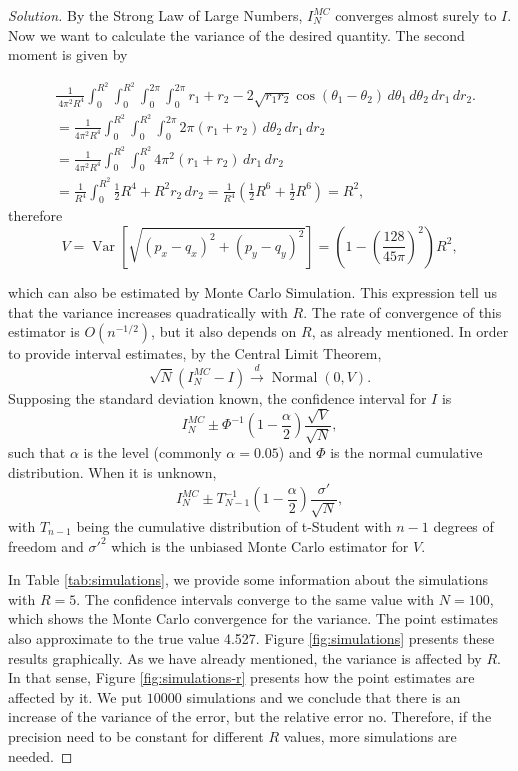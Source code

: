 \documentclass[a4paper,10pt, notitlepage]{report}
\newcommand{\var}{\operatorname{Var}}
\begin{document}
\begin{enumerate}
\begin{proof}[Solution]
By the Strong Law of Large Numbers, $I_N^{MC}$ converges almost surely to $I$.
Now we want to calculate the variance of the desired quantity. The second
moment is given by 

\begin{align*}
    &\frac{1}{\
    4\pi^2 R^4}\int_{0}^{R^2}\int_{0}^{R^2}\int_{0}^{2\pi}\int_{0}^{2\pi}r_1 + r_2 - 2\sqrt{r_1r_2}\cos(\theta_1 -\theta_2)
    \,d\theta_1\,d\theta_2\,dr_1\,dr_2. \\
    &= \frac{1}{4\pi^2 R^4}\int_{0}^{R^2}\int_{0}^{R^2}\int_{0}^{2\pi} 2\pi(r_1+r_2) \,d\theta_2\,dr_1\,dr_2 \\ 
    &= \frac{1}{4\pi^2 R^4}\int_{0}^{R^2}\int_{0}^{R^2} 4\pi^2(r_1+r_2) \,dr_1\,dr_2 \\
    &= \frac{1}{R^4}\int_{0}^{R^2} \frac{1}{2}R^4 + R^2r_2 \,dr_2 = \frac{1}{R^4}(\frac{1}{2}R^6 + \frac{1}{2}R^6) = R^2,
\end{align*}
therefore 
$$
V = \var\left[\sqrt{(p_x - q_x)^2 + (p_y - q_y)^2}\right] = \left(1 - \left(\frac{128}{45\pi}\right)^2\right)R^2,
$$

which can also be estimated by Monte Carlo Simulation. This expression tell us
that the variance increases quadratically with $R$. The rate of convergence of
this estimator is $O(n^{-1/2})$, but it also depends on $R$, as already
mentioned. In order to provide interval estimates, by the Central Limit
Theorem, 
$$\sqrt{N}(I_N^{MC} - I) \overset{d}{\to} \operatorname{Normal}(0, V).$$
Supposing the standard deviation known, the confidence interval for $I$ is
$$I_N^{MC} \pm \Phi^{-1}\left(1 - \frac{\alpha}{2}\right)\frac{\sqrt{V}}{\sqrt{N}},$$
such that $\alpha$ is the level (commonly $\alpha = 0.05$) and $\Phi$ is the
normal cumulative distribution. When it is unknown, 
$$I_N^{MC} \pm T_{N-1}^{-1}\left(1 - \frac{\alpha}{2}\right)\frac{\sigma
'}{\sqrt{N}},$$
with $T_{n-1}$ being the cumulative distribution of t-Student with $n-1$
degrees of freedom and $\sigma '^2$ which is the unbiased Monte Carlo estimator
for $V$.

In Table \ref{tab:simulations}, we provide some information about the simulations with $R
= 5$. The confidence intervals converge to the same value with $N = 100$, which
shows the Monte Carlo convergence for the variance. The point estimates also
approximate to the true value 4.527. Figure \ref{fig:simulations} presents
these results graphically. As we have already mentioned, the
variance is affected by $R$. In that sense, Figure \ref{fig:simulations-r}
presents how the point estimates are affected by it. We put
$10000$ simulations and we conclude that there is an increase of the variance
of the error, but the relative error no. Therefore, if the precision need to
be constant for different $R$ values, more simulations are needed. 


\end{proof}
\end{enumerate}
\end{document}
